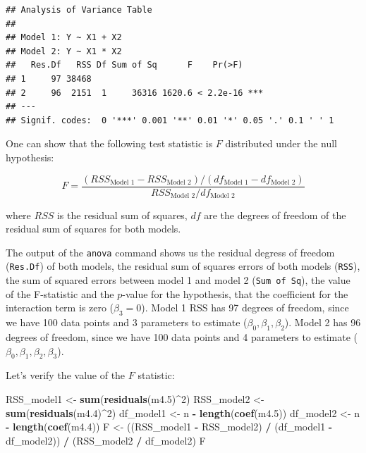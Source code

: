 \documentclass[
]{book}
\newenvironment{Shaded}{\begin{snugshade}}{\end{snugshade}}
\newcommand{\DecValTok}[1]{\textcolor[rgb]{0.00,0.00,0.81}{#1}}
\newcommand{\FloatTok}[1]{\textcolor[rgb]{0.00,0.00,0.81}{#1}}
\newcommand{\FunctionTok}[1]{\textcolor[rgb]{0.13,0.29,0.53}{\textbf{#1}}}
\newcommand{\NormalTok}[1]{#1}
\newcommand{\OtherTok}[1]{\textcolor[rgb]{0.56,0.35,0.01}{#1}}
\newcommand{\SpecialCharTok}[1]{\textcolor[rgb]{0.81,0.36,0.00}{\textbf{#1}}}
\begin{document}
\begin{verbatim}
## Analysis of Variance Table
## 
## Model 1: Y ~ X1 + X2
## Model 2: Y ~ X1 * X2
##   Res.Df   RSS Df Sum of Sq      F    Pr(>F)    
## 1     97 38468                                  
## 2     96  2151  1     36316 1620.6 < 2.2e-16 ***
## ---
## Signif. codes:  0 '***' 0.001 '**' 0.01 '*' 0.05 '.' 0.1 ' ' 1
\end{verbatim}

One can show that the following test statistic is \(F\) distributed under the null hypothesis:

\[ F = \frac{\left(RSS_{\text{Model 1}} - RSS_{\text{Model 2}}\right) / \left(df_{\text{Model 1}} - df_{\text{Model 2}}\right)}{RSS_{\text{Model 2}} / df_{\text{Model 2}}}\]

where \(RSS\) is the residual sum of squares,
\(df\) are the degrees of freedom of the residual sum of squares for both models.

The output of the \texttt{anova} command shows us the residual degress of freedom (\texttt{Res.Df})
of both models, the residual sum of squares errors of both models (\texttt{RSS}),
the sum of squared errors between model 1 and model 2 (\texttt{Sum\ of\ Sq}), the value of the
F-statistic and the \(p\)-value for the hypothesis, that the coefficient for
the interaction term is zero (\(\beta_3=0\)). Model 1 RSS has 97 degrees of freedom, since we have 100 data points
and 3 parameters to estimate (\(\beta_0, \beta_1, \beta_2\)). Model 2 has 96 degrees of freedom, since
we have 100 data points and 4 parameters to estimate (\(\beta_0, \beta_1, \beta_2, \beta_3\)).

Let's verify the value of the \(F\) statistic:

\begin{Shaded}
\begin{Highlighting}[]
\NormalTok{RSS\_model1 }\OtherTok{\textless{}{-}} \FunctionTok{sum}\NormalTok{(}\FunctionTok{residuals}\NormalTok{(m4}\FloatTok{.5}\NormalTok{)}\SpecialCharTok{\^{}}\DecValTok{2}\NormalTok{)}
\NormalTok{RSS\_model2 }\OtherTok{\textless{}{-}} \FunctionTok{sum}\NormalTok{(}\FunctionTok{residuals}\NormalTok{(m4}\FloatTok{.4}\NormalTok{)}\SpecialCharTok{\^{}}\DecValTok{2}\NormalTok{)}
\NormalTok{df\_model1 }\OtherTok{\textless{}{-}}\NormalTok{ n }\SpecialCharTok{{-}} \FunctionTok{length}\NormalTok{(}\FunctionTok{coef}\NormalTok{(m4}\FloatTok{.5}\NormalTok{))}
\NormalTok{df\_model2 }\OtherTok{\textless{}{-}}\NormalTok{ n }\SpecialCharTok{{-}} \FunctionTok{length}\NormalTok{(}\FunctionTok{coef}\NormalTok{(m4}\FloatTok{.4}\NormalTok{))}
\NormalTok{F }\OtherTok{\textless{}{-}}\NormalTok{ ((RSS\_model1 }\SpecialCharTok{{-}}\NormalTok{ RSS\_model2) }\SpecialCharTok{/}\NormalTok{ (df\_model1 }\SpecialCharTok{{-}}\NormalTok{ df\_model2)) }\SpecialCharTok{/}\NormalTok{ (RSS\_model2 }\SpecialCharTok{/}\NormalTok{ df\_model2)}
\NormalTok{F}
\end{Highlighting}
\end{Shaded}
\end{document}
